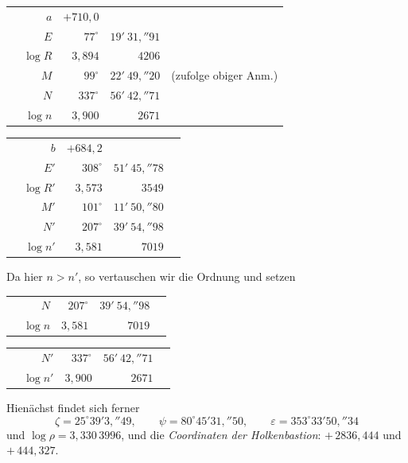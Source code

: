 \documentclass[12pt,a4paper]{article}
\theoremstyle{plain}
\theoremstyle{definition}
\theoremstyle{remark}
\begin{document}
\begin{center}
\begin{tabular}{l@{\quad}r@{\ $=$\ }r@{\ }r@{\ }r}
& $a$ & $+710{,}0$ & & \\
& $E$ & $77^{\circ}$ & $19'\ 31{,}''91$ & \\
& $\log R$ & $3{,}894$ & $4206$ & \\
& $M$ & $99^{\circ}$ & $22'\ 49{,}''20$ & (zufolge obiger Anm.) \\
& $N$ & $337^{\circ}$ & $56'\ 42{,}''71$ & \\
& $\log n$ & $3{,}900$ & $2671$ &
\end{tabular}
\end{center}

\begin{center}
\begin{tabular}{l@{\quad}r@{\ $=$\ }r@{\ }r@{\ }r}
& $b$ & $+684{,}2$ & & \\
& $E'$ & $308^{\circ}$ & $51'\ 45{,}''78$ & \\
& $\log R'$ & $3{,}573$ & $3549$ & \\
& $M'$ & $101^{\circ}$ & $11'\ 50{,}''80$ & \\
& $N'$ & $207^{\circ}$ & $39'\ 54{,}''98$ & \\
& $\log n'$ & $3{,}581$ & $7019$ &
\end{tabular}
\end{center}

Da hier $n > n'$, so vertauschen wir die Ordnung und setzen
\begin{center}
\begin{tabular}{l@{\quad}r@{\ $=$\ }r@{\ }r@{\ }r}
& $N$ & $207^{\circ}$ & $39'\ 54{,}''98$ & \\
& $\log n$ & $3{,}581$ & $7019$ &
\end{tabular}
\end{center}

\begin{center}
\begin{tabular}{l@{\quad}r@{\ $=$\ }r@{\ }r@{\ }r}
& $N'$ & $337^{\circ}$ & $56'\ 42{,}''71$ & \\
& $\log n'$ & $3{,}900$ & $2671$ &
\end{tabular}
\end{center}

Hienächst findet sich ferner
\[
\zeta = 25^{\circ} 39' 3{,}''49, \qquad \psi = 80^{\circ} 45' 31{,}''50, \qquad \varepsilon = 353^{\circ} 33' 50{,}''34
\]
und $\log \rho = 3{,}330\,3996$, und die \emph{Coordinaten der Holkenbastion}: $+\,2836{,}444$ und $+\,444{,}327$.
\end{document}
